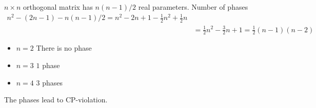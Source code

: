 $n \times n$ orthogonal matrix has $n(n-1)/2$ real parameters.
Number of phases
\begin{align*}
   n^2 - (2n-1) - n(n-1)/2 = n^2 - 2n + 1 - \frac{1}{2} n^2 + \frac{1}{2}n \\
   &= \frac{1}{2}n^2 - \frac{3}{2}n + 1 = \frac{1}{2} (n-1)(n-2)
\end{align*}

\begin{itemize}
   \item $n=2$ There is no phase
   \item $n=3$ $1$ phase \sm
   \item $n=4$ $3$ phases
\end{itemize}

The phases lead to CP-violation.
